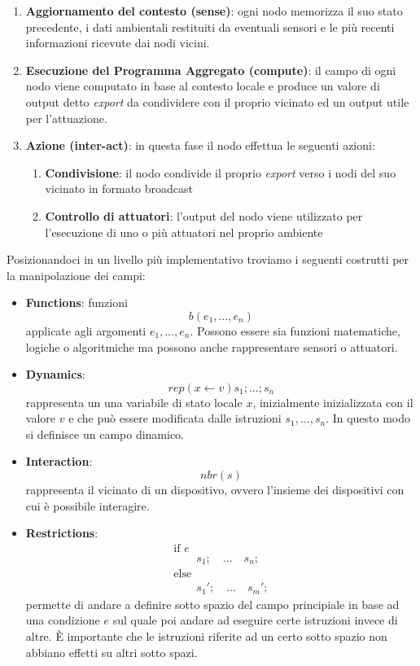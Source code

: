 \documentclass[12pt,a4paper,openright,twoside]{book}
\begin{document}
\begin{enumerate}
    \item \textbf{Aggiornamento del contesto (sense)}: ogni nodo memorizza il suo stato precedente, i dati ambientali restituiti da eventuali sensori e le più recenti informazioni ricevute dai nodi vicini.
    \item \textbf{Esecuzione del Programma Aggregato (compute)}: il campo di ogni nodo viene computato in base al contesto locale e produce un valore di output detto \textit{export} da condividere con il proprio vicinato ed un output utile per l'attuazione.
    \item \textbf{Azione (inter-act)}: in questa fase il nodo effettua le seguenti azioni:
    \begin{enumerate}
        \item \textbf{Condivisione}: il nodo condivide il proprio \textit{export} verso i nodi del suo vicinato in formato broadcast
        \item \textbf{Controllo di attuatori}: l'output del nodo viene 
        utilizzato per l'esecuzione di uno o più attuatori nel proprio ambiente
    \end{enumerate}
\end{enumerate}


Posizionandoci in un livello più implementativo troviamo i seguenti costrutti per la manipolazione dei campi: 

\begin{itemize}
    \item \textbf{Functions}: funzioni $$ b(e_1,\dots,e_n) $$ applicate agli argomenti $e_1,\dots,e_n$. Possono essere sia funzioni matematiche, logiche o algoritmiche ma possono anche rappresentare sensori o attuatori.
    \item \textbf{Dynamics}: $$ rep(x \leftarrow v){s_1;\dots;s_n} $$ rappresenta un una variabile di stato locale $x$, inizialmente inizializzata con il valore $v$ e che può essere modificata dalle istruzioni $s_1,\dots,s_n$. In questo modo si definisce un campo dinamico.
    \item \textbf{Interaction}: $$ nbr(s) $$ rappresenta il vicinato di un dispositivo, ovvero l'insieme dei dispositivi con cui è possibile interagire.
    \item \textbf{Restrictions}: $$
        \begin{array}{l}
        \text{if } e \\
        \qquad s_1; \quad \dots \quad s_n; \\
        \text{else} \\
        \qquad s_1'; \quad \dots \quad s_m';
        \end{array}
    $$
    permette di andare a definire sotto spazio del campo principiale in base ad una condizione $e$ sul quale poi andare ad eseguire certe istruzioni invece di altre. È importante che le istruzioni riferite ad un certo sotto spazio non abbiano effetti su altri sotto spazi.
\end{itemize}
\end{document}
